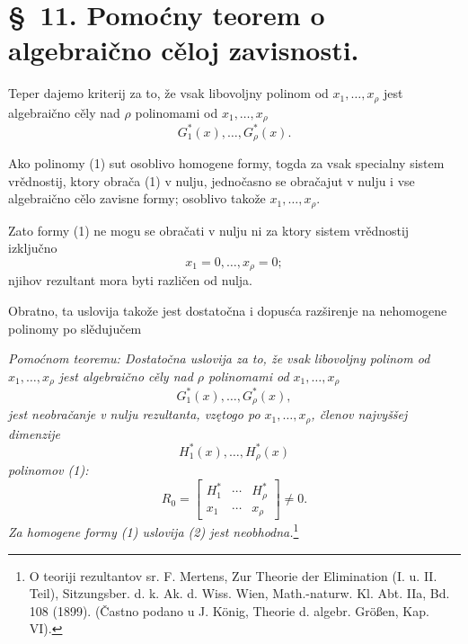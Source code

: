 \documentclass[11pt]{article}
\begin{document}
\section*{\S\ 11. Pomoćny teorem o algebraično cěloj zavisnosti.}

Teper dajemo kriterij za to, že vsak libovoljny polinom od $x_1,\ldots,x_\rho$ jest algebraično cěly nad $\rho$ polinomami od $x_1,\ldots,x_\rho$
\begin{equation}
  G_1^*(x),\ldots,G_\rho^*(x).
\tag{1}
\end{equation}

Ako polinomy (1) sut osoblivo homogene formy, togda za vsak specialny sistem vrědnostij, ktory obrača (1) v nulju, jednočasno se obračajut v nulju i vse algebraično cělo zavisne formy; osoblivo takože $x_1,\ldots,x_\rho$.

Zato formy (1) ne mogu se obračati v nulju ni za ktory sistem vrědnostij izključno
\[
  x_1=0,\ldots,x_\rho=0;
\]
njihov rezultant mora byti različen od nulja.

Obratno, ta uslovija takože jest dostatočna i dopusća razširenje na nehomogene polinomy po slědujučem

{\itshape Pomoćnom teoremu: Dostatočna uslovija za to, že vsak libovoljny polinom od $x_1,\ldots,x_\rho$ jest algebraično cěly nad $\rho$ polinomami od $x_1,\ldots,x_\rho$}
\[
  G_1^*(x),\ldots,G_\rho^*(x),
\]
{\itshape jest neobračanje v nulju rezultanta, vzętogo po $x_1,\ldots,x_\rho$, členov najvyššej dimenzije}
\[
  H_1^*(x),\ldots,H_\rho^*(x)
\]
{\itshape polinomov (1):}
\begin{equation}
  R_0=\left[
  \begin{array}{ccc}
    H_1^*&\cdots&H_\rho^*\\
    x_1&\cdots&x_\rho
  \end{array}
  \right]\ne0.
\tag{2}
\end{equation}
{\itshape Za homogene formy (1) uslovija (2) jest neobhodna.}\footnote{O teoriji rezultantov sr. F. Mertens, Zur Theorie der Elimination (I. u. II. Teil), Sitzungsber. d. k. Ak. d. Wiss. Wien, Math.-naturw. Kl. Abt. IIa, Bd. 108 (1899). (Častno podano u J. König, Theorie d. algebr. Größen, Kap. VI).}
\end{document}
